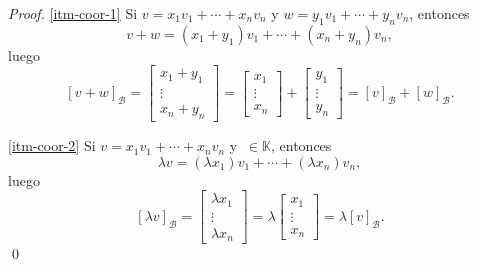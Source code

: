 \documentclass[handout]{beamer} %
\newcommand{\K}{\mathbb K}
\newcommand{\cB}{\mathcal{B}}
\begin{document}
    \begin{frame}
        \begin{proof}
            \ref{itm-coor-1} Si \;$v = x_1v_1 + \cdots +x_nv_n$\; y \;$w = y_1v_1 + \cdots +y_nv_n$, \;entonces 
            $$
            v + w = (x_1+y_1)v_1 + \cdots +(x_n+y_n)v_n,
            $$
            luego
            $$
            [v + w]_\mathcal{B} = \begin{bmatrix}x_1+y_1 \\ \vdots \\ x_n+y_n\end{bmatrix}
            = \begin{bmatrix}x_1 \\ \vdots \\ x_n\end{bmatrix}+\begin{bmatrix}y_1 \\ \vdots \\ y_n\end{bmatrix} = [v]_\mathcal{B} +[w]_\mathcal{B}.
            $$
            
            \ref{itm-coor-2} Si $v = x_1v_1 + \cdots +x_nv_n$ y $\ \in \K$, entonces 
            $$
            \lambda v = (\lambda x_1)v_1 + \cdots +(\lambda x_n)v_n,
            $$
            luego
            $$
            [\lambda v ]_\mathcal{B} = \begin{bmatrix}\lambda x_1 \\ \vdots \\ \lambda x_n\end{bmatrix}
            = \lambda \begin{bmatrix}x_1 \\ \vdots \\ x_n\end{bmatrix} = \lambda [v]_\mathcal{B}.
            $$\qed
        \end{proof}
    \end{frame}
    
    
    
\end{document}
